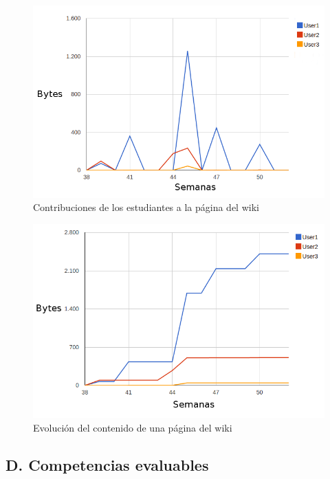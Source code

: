 \begin{figure}[h]
  \begin{center}
    \includegraphics[scale=0.5]{santa_contribuciones.png}
  \end{center}
  \caption{Contribuciones de los estudiantes a la página del wiki}
  \label{fig:SantaContribuciones}
\end{figure}

\newpage

\begin{figure}[h]
  \begin{center}
    \includegraphics[scale=0.5]{santa_evolution.png}
  \end{center}
  \caption{Evolución del contenido de una página del wiki}
  \label{fig:SantaEvolucion}
\end{figure}

	\subsection*{D. Competencias evaluables}

